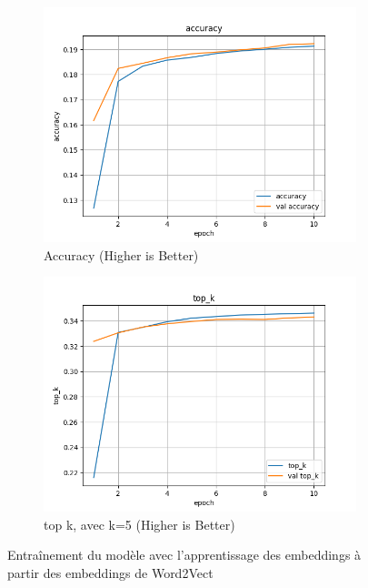 \documentclass[a4paper]{article}
\begin{document}
\begin{figure}[ht]
  \begin{subfigure}{0.47\textwidth}
    \includegraphics[width=\linewidth]{../logs/learnfromword2vect/accuracy.png}
    \caption{Accuracy (Higher is Better)}
  \end{subfigure}
  \hfill
  \begin{subfigure}{0.47\textwidth}
    \includegraphics[width=\linewidth]{../logs/learnfromword2vect/top_k.png}
    \caption{top k, avec k=5 (Higher is Better)}
  \end{subfigure}
  \caption{Entraînement du modèle avec l'apprentissage des embeddings à partir des embeddings de Word2Vect}
  \label{subfig:result model 3}
\end{figure}
\end{document}
